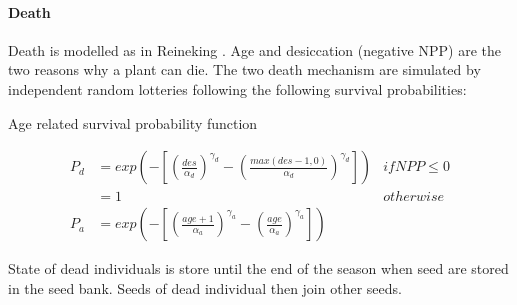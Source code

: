 \documentclass[a4paper,twoside, justified,marginals=raggedright, nobib]{tufte-handout}
\begin{document}
\paragraph{Death} Death is modelled as in Reineking \cite{reineking_environmental_2006}. Age and desiccation (negative NPP) are the two reasons why a plant can die. The two death mechanism are simulated by independent random lotteries following the following survival probabilities:

\begin{marginfigure}[-10pt]
\label{fig:derivaives}
\caption{Age related survival probability function}
\end{marginfigure}

\begin{align}
P_{d} &=  exp \left( - \left[\left(\frac{des}{\alpha_{d}}\right)^{\gamma_{d}} - \left(\frac{max(des - 1, 0)}{\alpha_{d}}\right)^{\gamma_{d}}\right]\right) & if NPP \le 0\\
&= 1 & otherwise\\
P_{a} &= exp \left( - \left[\left(\frac{age + 1}{\alpha_{a}}\right)^{\gamma_{a}} - \left(\frac{age}{\alpha_{a}}\right)^{\gamma_{a}}\right]\right)
\end{align}

State of dead individuals is store until the end of the season when seed are stored in the seed bank. Seeds of dead individual then join other seeds.
\end{document}
